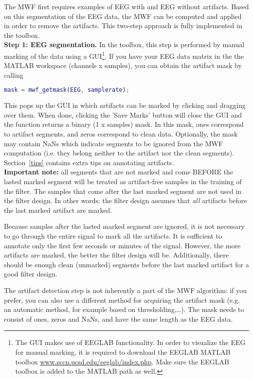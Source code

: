 \documentclass[11pt]{article}
\begin{document}
The MWF first requires examples of EEG with and EEG without artifacts. Based on this segmentation of the EEG data, the MWF can be computed and applied in order to remove the artifacts. This two-step approach is fully implemented in the toolbox.
\\

\textbf{Step 1: EEG segmentation.} In the toolbox, this step is performed by manual marking of the data using a GUI\footnote{The GUI makes use of EEGLAB functionality. In order to visualize the EEG for manual marking, it is required to download the EEGLAB MATLAB toolbox \url{www.sccn.ucsd.edu/eeglab/index.php}. Make sure the EEGLAB toolbox is added to the MATLAB path as well.}. If you have your EEG data matrix in the the MATLAB workspace (channels x samples), you can obtain the artifact mask by calling

\begin{lstlisting}[frame=single, language=matlab]
    mask = mwf_getmask(EEG, samplerate);
\end{lstlisting}

This pops up the GUI in which artifacts can be marked by clicking and dragging over them. When done, clicking the 'Save Marks' button will close the GUI and the function returns a binary (1 x samples) mask. In this mask, ones correspond to artifact segments, and zeros correspond to clean data. Optionally, the mask may contain NaNs which indicate segments to be ignored from the MWF computation (i.e. they belong neither to the artifact nor the clean segments). Section~\ref{tips} contains extra tips on annotating artifacts.
\\

\textbf{Important note:} all segments that are not marked and come BEFORE the lasted marked segment will be treated as artifact-free samples in the training of the filter. The samples that come after the last marked segment are not used in the filter design. In other words: the filter design assumes that \emph{all} artifacts before the last marked artifact are marked.

Because samples after the lasted marked segment are ignored, it is not necessary to go through the entire signal to mark all the artifacts. It is sufficient to annotate only the first few seconds or minutes of the signal. However, the more artifacts are marked, the better the filter design will be. Additionally, there should be enough clean (unmarked) segments before the last marked artifact for a good filter design.

The artifact detection step is not inherently a part of the MWF algorithm: if you prefer, you can also use a different method for acquiring the artifact mask (e.g. an automatic method, for example based on thresholding,\ldots). The mask needs to consist of ones, zeros and NaNs, and have the same length as the EEG data.
\\
\end{document}
